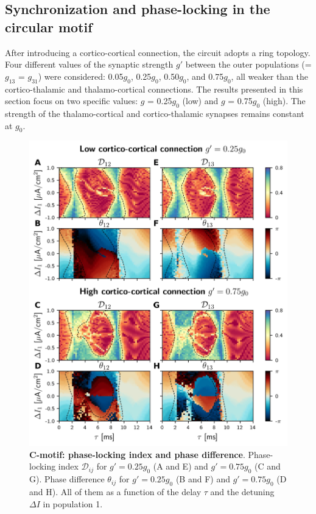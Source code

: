 \documentclass[../main.tex]{subfiles}
\begin{document}
\subsection{Synchronization and phase-locking in the circular motif}
After introducing a cortico-cortical connection, the circuit adopts a ring topology.
Four different values of the synaptic strength $g'$ between the outer populations (= $g_{13}$ = $g_{31}$) were considered: 0.05$g_0$, 0.25$g_0$, 0.50$g_0$, and 0.75$g_0$, all weaker than the cortico-thalamic and thalamo-cortical connections.
The results presented in this section focus on two specific values: $g$ = 0.25$g_0$ (low) and $g$ = 0.75$g_0$ (high). 
The strength of the thalamo-cortical and cortico-thalamic synapses remains constant at $g_0$.
\begin{figure}[!htb]
 \centering
    \includegraphics[width=\textwidth]{chapter2/figures/fig5}
    \caption{\textbf{C-motif: phase-locking index and phase difference}.
    Phase-locking index $\mathcal{D}_{ij}$ for $g'=0.25g_0$ (A and E) and $g'=0.75g_0$ (C and G).
    Phase difference $\theta_{ij}$ for $g'=0.25g_0$ (B and F) and $g'=0.75g_0$ (D and H).
    All of them as a function of the delay $\tau$ and the detuning $\Delta I$ in population 1.}
    \label{fig:cmotif_synchro_1}
\end{figure}
\end{document}
